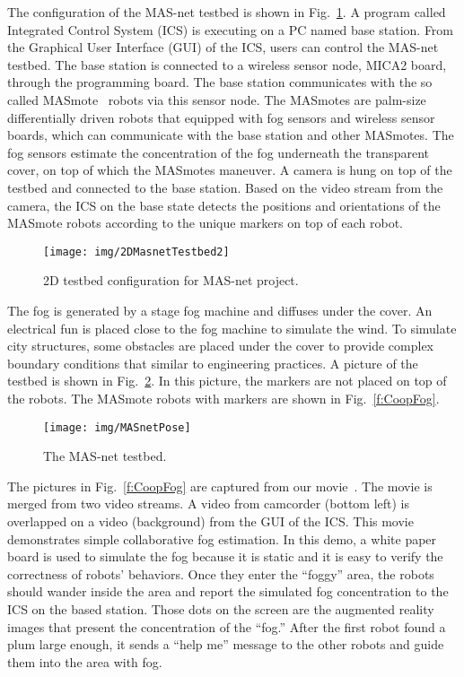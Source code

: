 The configuration of the MAS-net testbed is shown in Fig.~\ref{f:masnet2D}. A program called Integrated Control System (ICS) is executing on a PC named base station. From the Graphical User Interface (GUI) of the ICS, users can control the MAS-net testbed.
    The base station is connected to a wireless sensor node, MICA2 board, through the programming board. The base station communicates with the so called MASmote~\cite{ZhongminRobio04} robots via this sensor node.
        The MASmotes are palm-size differentially driven robots that equipped with fog sensors and wireless sensor boards, which can communicate with the base station and other MASmotes. The fog sensors estimate the concentration of the fog underneath the transparent cover, on top of which the MASmotes maneuver.
    A camera is hung on top of the testbed and connected to the base station. Based on the video stream from the camera, the ICS on the base state detects the positions and orientations of the MASmote robots according to the unique markers on top of each robot.

    \begin{figure}[htb]
       \centering
       \texttt{[image: img/2DMasnetTestbed2]}
       \caption{2D testbed configuration for MAS-net project.}
       \label{f:masnet2D}
     \end{figure}



    The fog is generated by a stage fog machine and diffuses under the cover. An electrical fun is placed close to the fog machine to simulate the wind. To simulate city structures, some obstacles are placed under the cover to provide complex boundary conditions that similar to engineering practices.
        A picture of the testbed is shown in Fig.~\ref{f:masnetpic}. In this picture, the markers are not placed on top of the robots. The MASmote robots with markers are shown in Fig.~\ref{f:CoopFog}.



\begin{figure}
\begin{center}
\texttt{[image: img/MASnetPose]}
  \end{center}
\caption{The MAS-net testbed.\label{f:masnetpic}}
\end{figure}


The pictures in Fig.~\ref{f:CoopFog} are captured from our movie~\cite{ChenSongMASnetMovie}.
 The movie is merged from two video streams. A video from camcorder (bottom left) is overlapped on a video (background) from the GUI of the ICS. This movie demonstrates simple collaborative fog estimation.
    In this demo, a white paper board is used to simulate the fog because it is static and it is easy to verify the correctness of robots' behaviors. Once they enter the ``foggy'' area, the robots should wander inside the area and report the simulated fog concentration to the ICS on the based station. Those dots on the screen are the augmented reality images that present the concentration of the ``fog.'' After the first robot found a plum large enough, it sends a ``help me'' message to the other robots and guide them into the area with fog.


